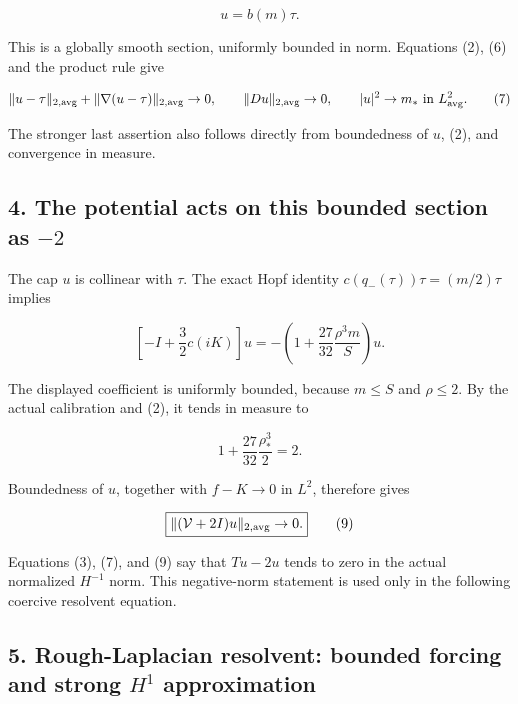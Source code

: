 \[
 u=b(m)\tau.
\]

This is a globally smooth section, uniformly bounded in norm. Equations
(2), (6) and the product rule give

\[
 \|u-\tau\|_{2,\rm avg}+\|\nabla(u-\tau)\|_{2,\rm avg}\to0,
 \qquad \|Du\|_{2,\rm avg}\to0,
 \qquad |u|^2\to m_*\text{ in }L^2_{\rm avg}.
\tag{7}
\]

The stronger last assertion also follows directly from boundedness of
\(u\), (2), and convergence in measure.

\hypertarget{o10strength:the-potential-acts-on-this-bounded-section-as--2}{%
\subsection{\texorpdfstring{4. The potential acts on this bounded
section as
\(-2\)}{4. The potential acts on this bounded section as -2}}\label{o10strength:the-potential-acts-on-this-bounded-section-as--2}}

The cap \(u\) is collinear with \(\tau\). The exact Hopf identity
\(c(q_-(\tau))\tau=(m/2)\tau\) implies

\[
 \left[-I+\frac32c(iK)\right]u
 =-\left(1+\frac{27}{32}\frac{\rho^3m}{S}\right)u.
\tag{8}
\]

The displayed coefficient is uniformly bounded, because \(m\le S\) and
\(\rho\le2\). By the actual calibration and (2), it tends in measure to

\[
 1+\frac{27}{32}\frac{\rho_*^3}{2}=2.
\]

Boundedness of \(u\), together with \(f-K\to0\) in \(L^2\), therefore
gives

\[
 \boxed{\|(\mathcal V+2I)u\|_{2,\rm avg}\to0.}\tag{9}
\]

Equations (3), (7), and (9) say that \(Tu-2u\) tends to zero in the
actual normalized \(H^{-1}\) norm. This negative-norm statement is used
only in the following coercive resolvent equation.

\hypertarget{o10strength:rough-laplacian-resolvent-bounded-forcing-and-strong-h1-approximation}{%
\subsection{\texorpdfstring{5. Rough-Laplacian resolvent: bounded
forcing and strong \(H^1\)
approximation}{5. Rough-Laplacian resolvent: bounded forcing and strong H\^{}1 approximation}}\label{o10strength:rough-laplacian-resolvent-bounded-forcing-and-strong-h1-approximation}}

